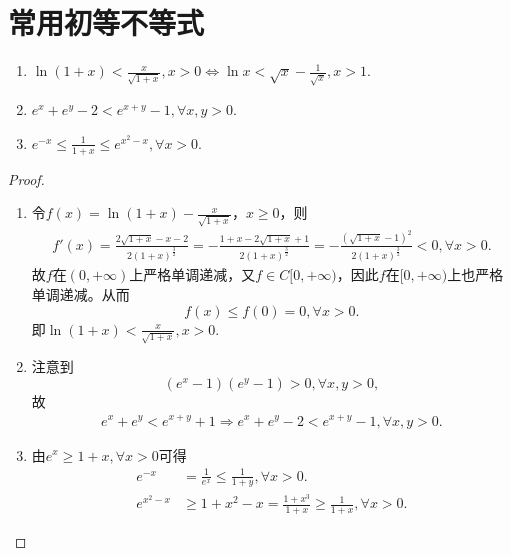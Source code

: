 \documentclass[../../main.tex]{subfiles}%
\begin{document}
\section{常用初等不等式}

\begin{proposition}[指数/对数函数不等式]\label{proposition:指数对数函数不等式}
\begin{enumerate}[(1)]
\item\label{proposition:指数对数函数不等式1} $\ln \left( 1+x \right) <\frac{x}{\sqrt{1+x}},x>0\iff \ln x<\sqrt{x}-\frac{1}{\sqrt{x}},x>1.$

\item \label{proposition:指数对数函数不等式3} $e^x+e^y-2<e^{x+y}-1,\forall x,y>0.$

\item \label{proposition:指数对数函数不等式4} $e^{-x}\leqslant \frac{1}{1+x}\leqslant e^{x^2-x},\forall x>0.$
\end{enumerate}
\end{proposition}
\begin{proof}
\begin{enumerate}[(1)]
\item 令\(f(x)=\ln(1 + x)-\frac{x}{\sqrt{1 + x}}\)，\(x\geqslant 0\)，则
\begin{align*}
f'\left( x \right) =\frac{2\sqrt{1+x}-x-2}{2\left( 1+x \right) ^{\frac{3}{2}}}=-\frac{1+x-2\sqrt{1+x}+1}{2\left( 1+x \right) ^{\frac{3}{2}}}=-\frac{\left( \sqrt{1+x}-1 \right) ^2}{2\left( 1+x \right) ^{\frac{3}{2}}}<0,\forall x>0.
\end{align*}
故\(f\)在\((0,+\infty)\)上严格单调递减，又\(f\in C[0,+\infty)\)，因此\(f\)在\([0,+\infty)\)上也严格单调递减。从而
\[
f(x)\leqslant f(0)=0,\forall x>0.
\]
即\(\ln(1 + x)<\frac{x}{\sqrt{1 + x}},x>0\).

\item 注意到
\[
(e^x-1)(e^y-1)>0,\forall x,y>0,
\]
故
\begin{align*}
e^x+e^y<e^{x+y}+1\Longrightarrow e^x+e^y-2<e^{x+y}-1,\forall x,y>0.
\end{align*}

\item 由$e^x\geqslant 1+x,\forall x>0$可得
\begin{align*}
e^{-x}&=\frac{1}{e^x}\leqslant \frac{1}{1+y},\forall x>0.
\\
e^{x^2-x}&\geqslant 1+x^2-x=\frac{1+x^3}{1+x}\geqslant \frac{1}{1+x},\forall x>0.
\end{align*}
\end{enumerate}
\end{proof}
\end{document}
